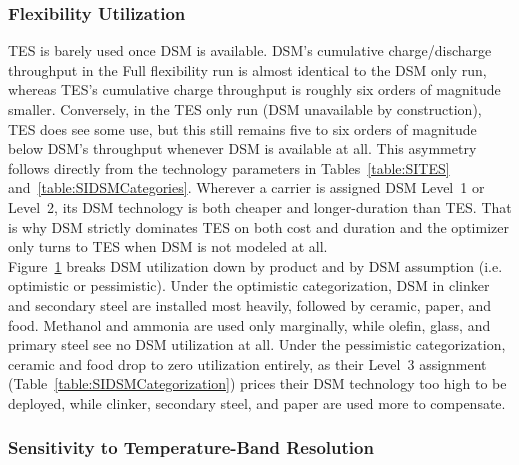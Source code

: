 \subsubsection{Flexibility Utilization}
\label{sec:si-flex-utilization}

TES is barely used once DSM is available. DSM's cumulative charge/discharge throughput in the Full flexibility run is almost identical to the DSM only run, whereas TES's cumulative charge throughput is roughly six orders of magnitude smaller. Conversely, in the TES only run (DSM unavailable by construction), TES does see some use, but this still remains five to six orders of magnitude below DSM's throughput whenever DSM is available at all. This asymmetry follows directly from the technology parameters in Tables~\ref{table:SITES} and~\ref{table:SIDSMCategories}. Wherever a carrier is assigned DSM Level~1 or Level~2, its DSM technology is both cheaper and longer-duration than TES. That is why DSM strictly dominates TES on both cost and duration and the optimizer only turns to TES when DSM is not modeled at all. \\

Figure~\ref{fig:SIFig2} breaks DSM utilization down by product and by DSM assumption (i.e. optimistic or pessimistic). Under the optimistic categorization, DSM in clinker and secondary steel are installed most heavily, followed by ceramic, paper, and food. Methanol and ammonia are used only marginally, while olefin, glass, and primary steel see no DSM utilization at all. Under the pessimistic categorization, ceramic and food drop to zero utilization entirely, as their Level~3 assignment (Table~\ref{table:SIDSMCategorization}) prices their DSM technology too high to be deployed, while clinker, secondary steel, and paper are used more to compensate. 

\begin{figure}[h!]
    \centering
    
    \label{fig:SIFig2}
\end{figure}

\subsubsection{Sensitivity to Temperature-Band Resolution}
\label{sec:si-temp-sensitivity}

